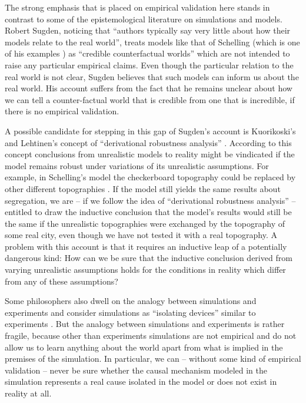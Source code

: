 \documentclass[12pt, english, a4paper]{article}
\begin{document}
The strong emphasis that is placed on empirical validation here stands
in contrast to some of the epistemological literature on simulations
and models. Robert Sugden, noticing that “authors typically say very
little about how their models relate to the real world”, treats models
like that of Schelling (which is one of his examples
\citep[6-8]{sugden:2000}) as “credible counterfactual worlds”
\citep[3]{sugden:2009} which are not intended to raise any particular
empirical claims. Even though the particular relation to the real
world is not clear, Sugden believes that such models can inform us
about the real world. His account suffers from the fact that he
remains unclear about how we can tell a counter-factual world that is
credible from one that is incredible, if there is no empirical
validation.

A possible candidate for stepping in this gap of Sugden’s account is
Kuorikoski’s and Lehtinen’s concept of “derivational robustness
analysis” \citep{kuorikoski-lehtinen:2009}. According to this concept
conclusions from unrealistic models to reality might be vindicated if
the model remains robust under variations of its unrealistic
assumptions. For example, in Schelling’s model the checkerboard
topography could be replaced by other different topographies
\citep[441]{aydinonat:2007}. If the model still yields the same
results about segregation, we are – if we follow the idea of
“derivational robustness analysis” – entitled to draw the inductive
conclusion that the model’s results would still be the same if the
unrealistic topographies were exchanged by the topography of some real
city, even though we have not tested it with a real topography.  A
problem with this account is that it requires an inductive leap of a
potentially dangerous kind: How can we be sure that the inductive
conclusion derived from varying unrealistic assumptions holds for the
conditions in reality which differ from any of these assumptions?

Some philosophers also dwell on the analogy between simulations and
experiments and consider simulations as “isolating devices” similar to
experiments \citep{maeki:2009}. But the analogy between simulations
and experiments is rather fragile, because other than experiments
simulations are not empirical and do not allow us to learn anything
about the world apart from what is implied in the premises of the
simulation. In particular, we can – without some kind of empirical
validation – never be sure whether the causal mechanism modeled in the
simulation represents a real cause isolated in the model or does not
exist in reality at all.
\end{document}
